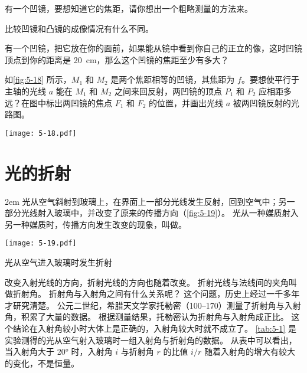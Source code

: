 \begin{Practice}
\begin{question}
  \item 有一个凹镜，要想知道它的焦距，请你想出一个粗略测量的方法来。
  \item 比较凹镜和凸镜的成像情况有什么不同。
  \item 有一个凹镜，把它放在你的面前，如果能从镜中看到你自己的正立的像，这时凹镜顶点到你的距离是 \qty{20}{cm}，那么这个凹镜的焦距至少有多大？
  \item 如\cref{fig:5-18} 所示，$M_1$ 和 $M_2$ 是两个焦距相等的凹镜，其焦距为 $f$。要想使平行于主轴的光线 $a$ 能在 $M_1$ 和 $M_2$ 之间来回反射，两凹镜的顶点 $P_1$ 和 $P_2$ 应相距多远？在图中标出两凹镜的焦点 $F_1$ 和 $F_2$ 的位置，并画出光线 $a$ 被两凹镜反射的光路图。
  \begin{figurehere}
    \begin{minipage}{\linewidth}\centering
      \texttt{[image: 5-18.pdf]}
      \caption{}\label{fig:5-18}
    \end{minipage}
  \end{figurehere}
\end{question}
\end{Practice}

 
\section{光的折射}
\medskip\noindent
\begin{minipage}{0.5\linewidth}\parindent2em
  光从空气斜射到玻璃上，在界面上一部分光线发生反射，回到空气中；另一部分光线射入玻璃中，并改变了原来的传播方向（\cref{fig:5-19}）。
  光从一种媒质射入另一种媒质时，传播方向发生改变的现象，叫做。
\end{minipage}\hfill
\begin{minipage}{0.45\linewidth}\centering
\begin{figurehere}
	\texttt{[image: 5-19.pdf]}
	\caption{光从空气进入玻璃时发生折射}\label{fig:5-19}
\end{figurehere}
\end{minipage}

\medskip
改变入射光线的方向，折射光线的方向也随着改变。
折射光线与法线间的夹角叫做折射角。
折射角与入射角之间有什么关系呢？
这个问题，历史上经过一千多年才研究清楚。
公元二世纪，希腊天文学家托勒密（100--170）测量了折射角与入射角，积累了大量的数据。
根据测量结果，托勒密认为折射角与入射角成正比。
这个结论在入射角较小时大体上是正确的，入射角较大时就不成立了。
\cref{tab:5-1} 是实验测得的光从空气射入玻璃时一组入射角与折射角的数据。
从表中可以看出，当入射角大于 \ang{20} 时，入射角 $i$ 与折射角 $r$ 的比值 $i/r$ 随着入射角的增大有较大的变化，不是恒量。


